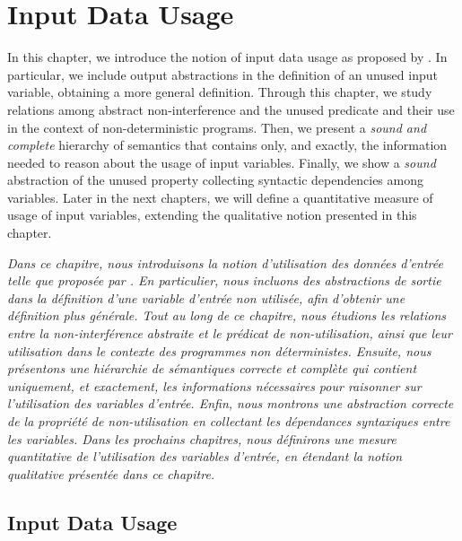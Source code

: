 \setchapterpreamble[u]{\margintoc}


\chapter{Input Data Usage}

\marginemptybox{5cm}

In this chapter, we introduce the notion of input data usage as proposed by .
In particular, we include output abstractions in the definition of an unused input variable, obtaining a more general definition.
Through this chapter, we study relations among abstract non-interference and the unused predicate and their use in the context of non-deterministic programs.
Then, we present a \emph{sound and complete} hierarchy of semantics that contains only, and exactly, the information needed to reason about the usage of input variables.
Finally, we show a \emph{sound} abstraction of the unused property collecting syntactic dependencies among variables.
Later in the next chapters, we will define a quantitative measure of usage of input variables, extending the qualitative notion presented in this chapter.


\frenchdiv

\emph{Dans ce chapitre, nous introduisons la notion d'utilisation des données d'entrée telle que proposée par \textcite{Urban2018}. En particulier, nous incluons des abstractions de sortie dans la définition d'une variable d'entrée non utilisée, afin d'obtenir une définition plus générale. Tout au long de ce chapitre, nous étudions les relations entre la non-interférence abstraite et le prédicat de non-utilisation, ainsi que leur utilisation dans le contexte des programmes non déterministes. Ensuite, nous présentons une hiérarchie de sémantiques \emph{correcte et complète} qui contient uniquement, et exactement, les informations nécessaires pour raisonner sur l'utilisation des variables d'entrée. Enfin, nous montrons une abstraction \emph{correcte} de la propriété de non-utilisation en collectant les dépendances syntaxiques entre les variables. Dans les prochains chapitres, nous définirons une mesure quantitative de l'utilisation des variables d'entrée, en étendant la notion qualitative présentée dans ce chapitre.}

\section{Input Data Usage}

